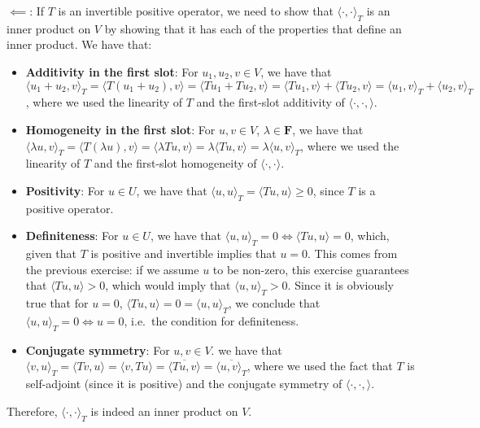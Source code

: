 \begin{solution}
    $\impliedby$: If $T$ is an invertible positive operator, we need to show that $\langle \cdot, \cdot \rangle_{T}$ is an inner product on $V$ by showing that it has each of the properties that define an inner product. We have that:
    \begin{itemize}
        \item \textbf{Additivity in the first slot}: For $u_1, u_2, v \in V$, we have that $\langle u_1 + u_2, v \rangle_{T} = \langle T(u_1 + u_2), v \rangle = \langle Tu_1 + Tu_2, v \rangle = \langle Tu_1, v \rangle + \langle Tu_2, v \rangle = \langle u_1, v \rangle_{T} + \langle u_2, v \rangle_{T}$, where we used the linearity of $T$ and the first-slot additivity of $\langle \cdot, \cdot, \rangle$.
        \item \textbf{Homogeneity in the first slot}: For $u, v \in V$, $\lambda \in \mathbf{F}$, we have that $\langle \lambda u, v \rangle_{T} = \langle T(\lambda u), v \rangle = \langle \lambda Tu, v \rangle = \lambda \langle Tu, v \rangle = \lambda \langle u, v\rangle_{T}$, where we used the linearity of $T$ and the first-slot homogeneity of $\langle \cdot, \cdot \rangle$.
        \item \textbf{Positivity}: For $u \in U$, we have that $\langle u, u \rangle_{T} = \langle Tu, u \rangle \geq 0$, since $T$ is a positive operator.
        \item \textbf{Definiteness}: For $u \in U$, we have that $\langle u, u \rangle_{T} = 0 \iff \langle Tu, u \rangle = 0$, which, given that $T$ is positive and invertible implies that $u = 0$. This comes from the previous exercise: if we assume $u$ to be non-zero, this exercise guarantees that $\langle Tu, u \rangle > 0$, which would imply that $\langle u, u\rangle_{T} > 0$. Since it is obviously true that for $u = 0$, $\langle Tu, u \rangle = 0 = \langle u, u \rangle_{T}$, we conclude that $\langle u, u \rangle_{T} = 0  \iff u = 0$, i.e.\ the condition for definiteness.
        \item \textbf{Conjugate symmetry}: For $u, v \in V$. we have that $\langle v, u \rangle_{T} = \langle Tv, u \rangle = \langle v, Tu \rangle = \overline{\langle Tu, v \rangle} = \overline{\langle u, v \rangle_{T}}$, where we used the fact that $T$ is self-adjoint (since it is positive) and the conjugate symmetry of $\langle \cdot, \cdot, \rangle$.
    \end{itemize}
    Therefore, $\langle \cdot, \cdot \rangle_{T}$ is indeed an inner product on $V$.
\end{solution}

